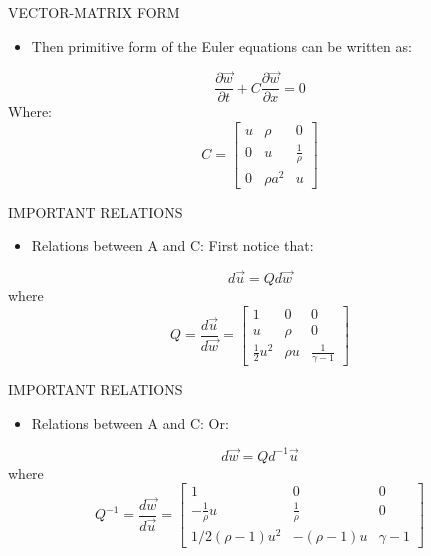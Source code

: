 \documentclass{beamer}
\begin{document}
\begin{frame}{VECTOR-MATRIX FORM}
  \begin{itemize}
   \item Then primitive form of the Euler equations can be written as:
  \end{itemize}
  \begin{equation}
   \frac{\partial{\vec{w}}}{\partial{t}}+C\frac{\partial{\vec{w}}}{\partial{x}}=0
  \end{equation}
Where:
  \begin{equation}
   C=\begin{bmatrix}
    u & \rho & 0\\ 
    0 & u & \frac{1}{\rho}\\ 
    0 & {\rho}a^2 & u
    \end{bmatrix}
  \end{equation}
\end{frame}

\begin{frame}{IMPORTANT RELATIONS}
  \begin{itemize}
   \item Relations between A and C: First notice that:
  \end{itemize}
  \begin{equation}
    d\vec{u}=Qd\vec{w}
  \end{equation}
where
  \begin{equation}
    Q=\frac{d\vec{u}}{d\vec{w}}=\begin{bmatrix}
    1 & 0 & 0\\ 
    u & \rho & 0\\ 
    \frac{1}{2}u^2 & {\rho}u & \frac{1}{\gamma-1}
    \end{bmatrix} 
  \end{equation}
\end{frame}

\begin{frame}{IMPORTANT RELATIONS}
  \begin{itemize}
   \item Relations between A and C: Or:
  \end{itemize}
  \begin{equation}
    d\vec{w}=Qd^{-1}\vec{u} 
  \end{equation}
where
  \begin{equation}
    Q^{-1}=\frac{d\vec{w}}{d\vec{u}}=\begin{bmatrix}
    1 & 0 & 0\\ 
    -\frac{1}{\rho}u & \frac{1}{\rho} & 0\\ 
    1/2(\rho-1)u^2 & -(\rho-1)u & \gamma-1
    \end{bmatrix}
  \end{equation}
\end{frame}
\end{document}
